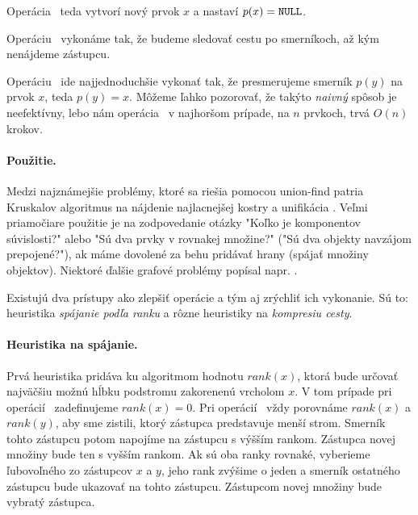 Operácia \makeset\ teda vytvorí nový prvok $x$ a nastaví $p(x) = \texttt{NULL}$. 

Operáciu \find\ vykonáme tak, že budeme sledovať cestu po smerníkoch, až 
kým nenájdeme zástupcu. 

Operáciu \union\ ide najjednoduchšie vykonať tak, že presmerujeme smerník 
$p(y)$ na prvok $x$, teda $p(y) = x$. 
Môžeme ľahko pozorovať, že takýto \emph{naivný} spôsob je neefektívny, 
lebo nám operácia \find\ v najhoršom prípade, na $n$ prvkoch, trvá $O(n)$ 
krokov. 

\paragraph{Použitie.}

Medzi najznámejšie problémy, ktoré sa riešia pomocou 
union-find patria Kruskalov algoritmus na nájdenie najlacnejšej kostry 
\citep{kruskal} a unifikácia \citep{unif}. Veľmi priamočiare použitie je 
na zodpovedanie otázky "Koľko je komponentov súvislosti?" alebo
"Sú dva prvky v rovnakej množine?" ("Sú dva objekty navzájom prepojené?"), 
ak máme dovolené za behu pridávať hrany (spájať množiny objektov). 
Niektoré ďalšie grafové problémy popísal napr. \citet{paths1}.

\bigskip
Existujú dva prístupy ako zlepšiť operácie a tým aj zrýchliť ich vykonanie. 
Sú to: heuristika \emph{spájanie podľa ranku} a rôzne heuristiky na 
\emph{kompresiu cesty}. 

\paragraph{Heuristika na spájanie.}

Prvá heuristika pridáva ku algoritmom hodnotu 
$rank(x)$, ktorá bude určovať najväčšiu možnú hĺbku podstromu zakorenenú 
vrcholom $x$. V tom prípade pri o\-pe\-rá\-cií \makeset\ zadefinujeme 
$rank(x) = 0$. 
Pri o\-pe\-rá\-cií \union\ vždy porovnáme $rank(x)$ a $rank(y)$, aby sme zistili, 
ktorý zástupca predstavuje menší strom. Smerník tohto zástupcu potom napojíme 
na zástupcu s výšším rankom. Zástupca novej množiny bude ten s vyšším rankom. 
Ak sú oba ranky rovnaké, vyberieme ľubovoľného zo zástupcov $x$ a $y$, 
jeho rank zvýšime o jeden a smerník ostatného zástupcu bude ukazovať 
na tohto zástupcu. Zástupcom novej množiny bude vybratý zástupca. 

